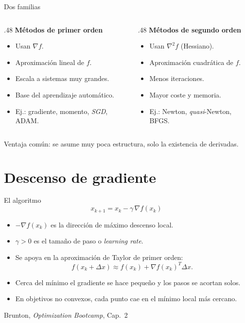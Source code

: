 \documentclass[10pt,aspectratio=169]{beamer}
\newcommand{\fuente}{\vfill{\scriptsize\color{gray}Brunton, \emph{Optimization Bootcamp}, Cap.~2}}
\begin{document}
\begin{frame}{Dos familias}
  \small
  \begin{columns}[T,onlytextwidth]
    \begin{column}{.48\textwidth}
      \textbf{Métodos de primer orden}
      \begin{itemize}
        \item Usan $\nabla f$.
        \item Aproximación lineal de $f$.
        \item Escala a sistemas muy grandes.
        \item Base del aprendizaje automático.
        \item Ej.: gradiente, momento, \emph{SGD}, ADAM.
      \end{itemize}
    \end{column}
    \begin{column}{.48\textwidth}
      \textbf{Métodos de segundo orden}
      \begin{itemize}
        \item Usan $\nabla^2 f$ (Hessiano).
        \item Aproximación cuadrática de $f$.
        \item Menos iteraciones.
        \item Mayor coste y memoria.
        \item Ej.: Newton, \emph{quasi}-Newton, BFGS.
      \end{itemize}
    \end{column}
  \end{columns}
  \vfill
  {\scriptsize\color{gray}
    Ventaja común: se asume muy poca estructura, solo la existencia de derivadas.}
\end{frame}

\section{Descenso de gradiente}

\begin{frame}{El algoritmo}
  \small
  \[
    \boxed{\;x_{k+1}=x_k-\gamma\,\nabla f(x_k)\;}
  \]
  \begin{itemize}
    \item $-\nabla f(x_k)$ es la dirección de máximo descenso local.
    \item $\gamma>0$ es el tamaño de paso o \emph{learning rate}.
    \item Se apoya en la aproximación de Taylor de primer orden:
      \[
        f(x_k+\Delta x)\approx f(x_k)+\nabla f(x_k)^{T}\Delta x.
      \]
    \item Cerca del mínimo el gradiente se hace pequeño y los pasos se acortan solos.
    \item En objetivos no convexos, cada punto cae en el mínimo local más cercano.
  \end{itemize}
  \fuente
\end{frame}
\end{document}
